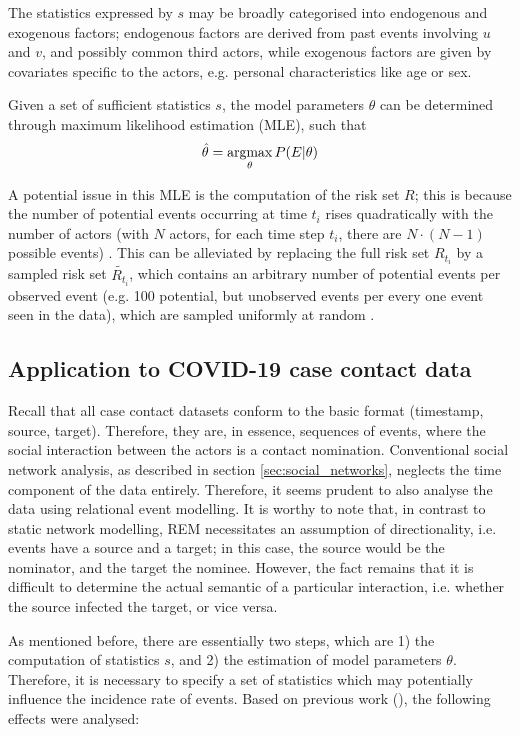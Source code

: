 The statistics expressed by $s$ may be broadly categorised into endogenous and exogenous factors; endogenous factors are derived from past events involving $u$ and $v$, and possibly common third actors, while exogenous factors are given by covariates specific to the actors, e.g. personal characteristics like age or sex. 

Given a set of sufficient statistics $s$, the model parameters $\theta$ can be determined through maximum likelihood estimation (MLE), such that \[\hat{\theta} = \operatorname*{argmax}_{\theta} P(E|\theta)\]

A potential issue in this MLE is the computation of the risk set $R$; this is because the number of potential events occurring at time $t_i$ rises quadratically with the number of actors (with $N$ actors, for each time step $t_i$, there are $N \cdot (N - 1)$ possible events) \cite{butts20084}. This can be alleviated by replacing the full risk set $R_{t_i}$ by a sampled risk set $\tilde{R_{t_i}}$, which contains an arbitrary number of potential events per observed event (e.g. 100 potential, but unobserved events per every one event seen in the data), which are sampled uniformly at random \cite{eventnet_rem}.

\subsection{Application to COVID-19 case contact data}
\label{sec:rem_application}

Recall that all case contact datasets conform to the basic format (timestamp, source, target). Therefore, they are, in essence, sequences of events, where the social interaction between the actors is a contact nomination. Conventional social network analysis, as described in section \ref{sec:social_networks}, neglects the time component of the data entirely. Therefore, it seems prudent to also analyse the data using relational event modelling. It is worthy to note that, in contrast to static network modelling, REM necessitates an assumption of directionality, i.e. events have a source and a target; in this case, the source would be the nominator, and the target the nominee. However, the fact remains that it is difficult to determine the actual semantic of a particular interaction, i.e. whether the source infected the target, or vice versa.

As mentioned before, there are essentially two steps, which are 1) the computation of statistics $s$, and 2) the estimation of model parameters $\theta$. Therefore, it is necessary to specify a set of statistics which may potentially influence the incidence rate of events. Based on previous work (\cite{butts20084,brandes2009networks,stadtfeld2017interactions}), the following effects were analysed:

